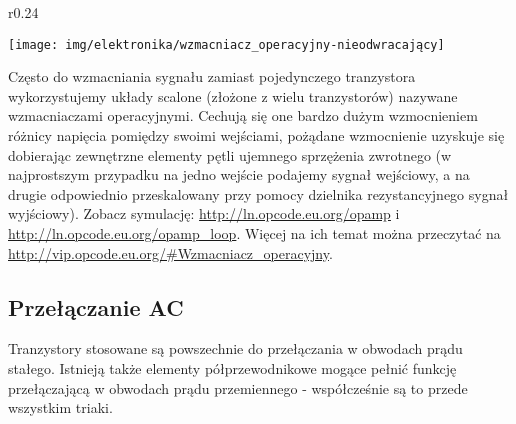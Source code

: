 \vspace{5pt}

\begin{wrapfigure}{r}{0.24\textwidth}
  \begin{center}
    \vspace{-25pt}
    \texttt{[image: img/elektronika/wzmacniacz\_operacyjny-nieodwracający]}
    \vspace{-27pt}
  \end{center}
\end{wrapfigure}

Często do wzmacniania sygnału zamiast pojedynczego tranzystora wykorzystujemy układy scalone (złożone z wielu tranzystorów) nazywane wzmacniaczami operacyjnymi.
Cechują się one bardzo dużym wzmocnieniem różnicy napięcia pomiędzy swoimi wejściami, pożądane wzmocnienie uzyskuje się dobierając zewnętrzne elementy pętli ujemnego sprzężenia zwrotnego
	(w najprostszym przypadku na jedno wejście podajemy sygnał wejściowy, a na drugie odpowiednio przeskalowany przy pomocy dzielnika rezystancyjnego sygnał wyjściowy).
Zobacz symulację: \url{http://ln.opcode.eu.org/opamp} i \url{http://ln.opcode.eu.org/opamp_loop}. Więcej na ich temat można przeczytać na \url{http://vip.opcode.eu.org/#Wzmacniacz_operacyjny}.

\subsection{Przełączanie AC}
Tranzystory stosowane są powszechnie do przełączania w obwodach prądu stałego. Istnieją także elementy półprzewodnikowe mogące pełnić funkcję przełączającą w obwodach prądu przemiennego - współcześnie są to przede wszystkim triaki.
